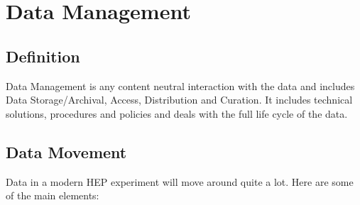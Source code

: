\section{Data Management}
\label{data}


\subsection{Definition}
Data Management is any content neutral interaction with the data and includes Data Storage/Archival, Access, 
Distribution and Curation. It includes technical solutions, procedures and policies and deals with the full life 
cycle of the data. 


\subsection{Data Movement}
Data in a modern HEP experiment will move around quite a lot. Here are some of the main elements:

